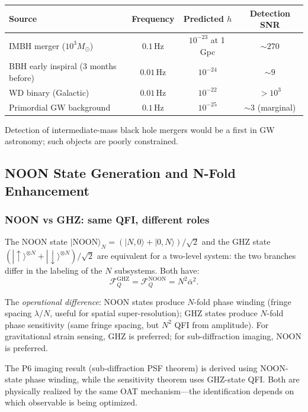\documentclass[11pt]{article}
\theoremstyle{definition}
\theoremstyle{remark}
\begin{document}
\begin{center}
\begin{tabular}{lccc}
\toprule
Source & Frequency & Predicted $h$ & Detection SNR \\
\midrule
IMBH merger ($10^3 M_\odot$) & $0.1$\,Hz & $10^{-23}$ at 1\,Gpc & $\sim 270$ \\
BBH early inspiral (3 months before) & $0.01$\,Hz & $10^{-24}$ & $\sim 9$ \\
WD binary (Galactic) & $0.01$\,Hz & $10^{-22}$ & $> 10^3$ \\
Primordial GW background & $0.1$\,Hz & $10^{-25}$ & $\sim 3$ (marginal) \\
\bottomrule
\end{tabular}
\end{center}

Detection of intermediate-mass black hole mergers would be a first
in GW astronomy; such objects are poorly constrained.

\subsection{NOON State Generation and N-Fold Enhancement}

\subsubsection{NOON vs GHZ: same QFI, different roles}

The NOON state $|\mathrm{NOON}\rangle_N = (|N,0\rangle + |0,N\rangle)/\sqrt{2}$
and the GHZ state $(|\uparrow\rangle^{\otimes N} + |\downarrow\rangle^{\otimes N})/\sqrt{2}$
are equivalent for a two-level system: the two branches differ in the
labeling of the $N$ subsystems. Both have:
\begin{equation}
\mathcal{F}_Q^{\mathrm{GHZ}} = \mathcal{F}_Q^{\mathrm{NOON}} = N^2 \bar{\alpha}^2.
\end{equation}

The \emph{operational difference}: NOON states produce $N$-fold phase
winding (fringe spacing $\lambda/N$, useful for spatial super-resolution);
GHZ states produce $N$-fold phase sensitivity (same fringe spacing,
but $N^2$ QFI from amplitude). For gravitational strain sensing, GHZ
is preferred; for sub-diffraction imaging, NOON is preferred.

The P6 imaging result (sub-diffraction PSF theorem) is derived using
NOON-state phase winding, while the sensitivity theorem uses GHZ-state
QFI. Both are physically realized by the same OAT mechanism---the
identification depends on which observable is being optimized.
\end{document}
